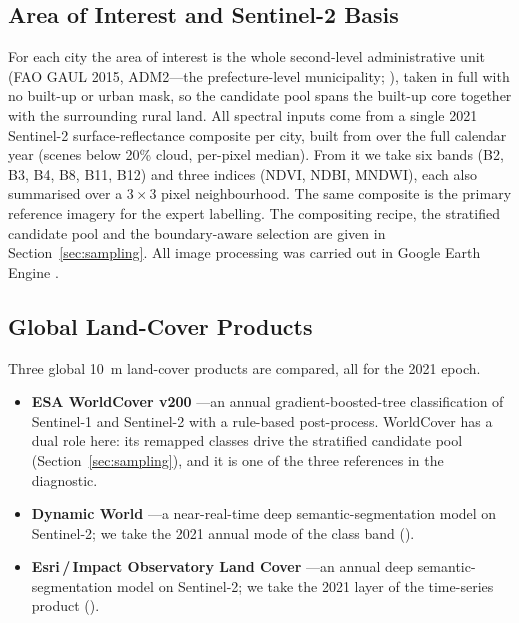 \documentclass[remotesensing,article,submit,moreauthors]{Definitions/mdpi}
\begin{document}
\subsection{Area of Interest and Sentinel-2 Basis}\label{sec:aoi}

For each city the area of interest is the whole second-level administrative unit
(FAO GAUL 2015, ADM2---the prefecture-level municipality;
\cite{fao2015gaul}), taken in full with no built-up or urban mask, so the
candidate pool spans the built-up core together with the surrounding rural
land. All spectral inputs come from a single 2021 Sentinel-2
surface-reflectance composite per city, built from
\href{https://developers.google.com/earth-engine/datasets/catalog/COPERNICUS_S2_SR_HARMONIZED}{} over the full calendar year (scenes
below 20\% cloud, per-pixel median). From it we take six bands (B2, B3, B4, B8,
B11, B12) and three indices (NDVI, NDBI, MNDWI), each also summarised over a
$3 \times 3$ pixel neighbourhood. The same composite is the primary reference
imagery for the expert labelling. The compositing recipe, the stratified
candidate pool and the boundary-aware selection are given in
Section~\ref{sec:sampling}. All image processing was carried out in Google
Earth Engine \citep{gorelick2017}.

\subsection{Global Land-Cover Products}\label{sec:products}

Three global 10~m land-cover products are compared, all for the 2021 epoch.

\begin{itemize}[leftmargin=*]
\item \textbf{ESA WorldCover v200} \citep{zanaga2022}---an annual
  gradient-boosted-tree classification of Sentinel-1 and Sentinel-2 with a
  rule-based post-process. WorldCover has a dual role here: its remapped classes
  drive the stratified candidate pool (Section~\ref{sec:sampling}), and it is
  one of the three references in the diagnostic.
\item \textbf{Dynamic World} \citep{brown2022}---a near-real-time deep
  semantic-segmentation model on Sentinel-2; we take the 2021 annual mode of
  the class band (\href{https://developers.google.com/earth-engine/datasets/catalog/GOOGLE_DYNAMICWORLD_V1}{}).
\item \textbf{Esri\,/\,Impact Observatory Land Cover} \citep{karra2021}---an
  annual deep semantic-segmentation model on Sentinel-2; we take the 2021 layer
  of the time-series product (\href{https://gee-community-catalog.org/projects/S2TSLULC/}{}).
\end{itemize}
\end{document}

